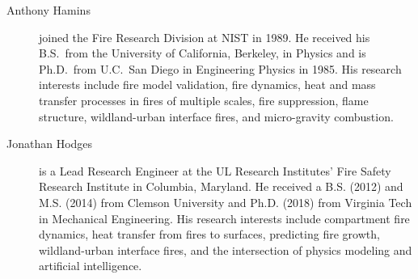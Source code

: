 \begin{description}
\item[Anthony Hamins] joined the Fire Research Division at NIST in 1989. He received his B.S.~from the University of California, Berkeley, in Physics and is Ph.D.~from U.C.~San Diego in Engineering Physics in 1985.  His research interests include fire model validation, fire dynamics, heat and mass transfer processes in fires of multiple scales, fire suppression, flame structure, wildland-urban interface fires, and micro-gravity combustion.

\item[Jonathan Hodges] is a Lead Research Engineer at the UL Research Institutes' Fire Safety Research Institute in Columbia, Maryland. He received a B.S. (2012) and M.S. (2014) from Clemson University and Ph.D. (2018) from Virginia Tech in Mechanical Engineering. His research interests include compartment fire dynamics, heat transfer from fires to surfaces, predicting fire growth, wildland-urban interface fires, and the intersection of physics modeling and artificial intelligence.





\end{description}
